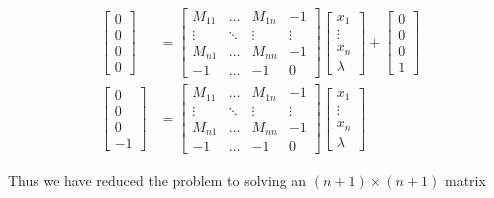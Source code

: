 \documentclass{article}
\begin{document}
\begin{align*}
\begin{bmatrix}
	0 \\
	0 \\
	0 \\
	0
\end{bmatrix}
&=
\begin{bmatrix}
	M_{11} & \dots  & M_{1n} & -1 \\
	\vdots & \ddots & \vdots & \vdots \\
	M_{n1} & \dots  & M_{nn} & -1 \\
	-1     & \dots  & -1	 & 0
\end{bmatrix}
\begin{bmatrix}
	x_1 \\ \vdots \\ x_n \\ \lambda
\end{bmatrix} +
\begin{bmatrix}
	0 \\
	0 \\
	0 \\
	1
\end{bmatrix} \\
\begin{bmatrix}
	0 \\
	0 \\
	0 \\
	-1
\end{bmatrix}
&=
\begin{bmatrix}
	M_{11} & \dots  & M_{1n} & -1 \\
	\vdots & \ddots & \vdots & \vdots \\
	M_{n1} & \dots  & M_{nn} & -1 \\
	-1     & \dots  & -1	 & 0
\end{bmatrix}
\begin{bmatrix}
	x_1 \\ \vdots \\ x_n \\ \lambda
\end{bmatrix}
\end{align*}

Thus we have reduced the problem to solving an $(n+1) \times (n+1)$ matrix
\end{document}
